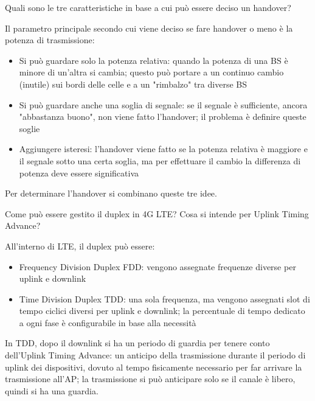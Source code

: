 \begin{questions}
    \question Quali sono le tre caratteristiche in base a cui può essere deciso un handover? 
    
    \begin{solution}
        Il parametro principale secondo cui viene deciso se fare handover o meno è la potenza di trasmissione:
        \begin{itemize}
            \item Si può guardare solo la potenza relativa: quando la potenza di una BS è minore di un'altra si cambia; questo può portare a un continuo cambio (inutile) sui bordi delle celle e a un "rimbalzo" tra diverse BS
            
            \item Si può guardare anche una soglia di segnale: se il segnale è sufficiente, ancora "abbastanza buono", non viene fatto l'handover; il problema è definire queste soglie
            
            \item Aggiungere isteresi: l'handover viene fatto se la potenza relativa è maggiore e il segnale sotto una certa soglia, ma per effettuare il cambio la differenza di potenza deve essere significativa
        \end{itemize}
        Per determinare l'handover si combinano queste tre idee.
    \end{solution}
    
    \question Come può essere gestito il duplex in 4G LTE? Cosa si intende per Uplink Timing Advance?
    
    \begin{solution}
        All'interno di LTE, il duplex può essere: 
        \begin{itemize}
            \item Frequency Division Duplex FDD: vengono assegnate frequenze diverse per uplink e downlink
            
            \item Time Division Duplex TDD: una sola frequenza, ma vengono assegnati slot di tempo ciclici diversi per uplink e downlink; la percentuale di tempo dedicato a ogni fase è configurabile in base alla necessità
        \end{itemize}
        
        In TDD, dopo il downlink si ha un periodo di guardia per tenere conto dell'Uplink Timing Advance: un anticipo della trasmissione durante il periodo di uplink dei dispositivi, dovuto al tempo fisicamente necessario per far arrivare la trasmissione all'AP; la trasmissione si può anticipare solo se il canale è libero, quindi si ha una guardia.
    \end{solution}
    

\end{questions}
